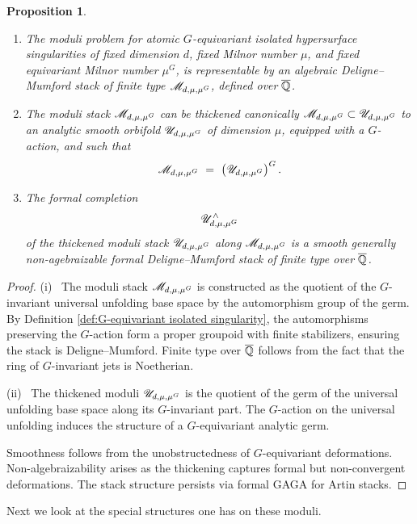 \documentclass[twoside,leqno]{article}
\numberwithin{equation}{section}
\theoremstyle{plain}
\newtheorem{proposition}[equation]{Proposition}
\theoremstyle{definition}
\begin{document}
\begin{proposition}
\begin{enumerate}[wide,label=(\roman*)]
    \item The moduli problem for atomic $G$-equivariant isolated hypersurface singularities of fixed dimension $d$, fixed Milnor number $\mu$, and fixed equivariant Milnor number $\mu^{G}$, is representable by an algebraic Deligne--Mumford stack of finite type 
    $\mathscr{M}_{d,\mu,\mu^{G}}$, defined over $\overline{\mathbb Q}$.
    \item The moduli stack  $\mathscr{M}_{d,\mu,\mu^{G}}$ can be thickened canonically $\mathscr{M}_{d,\mu,\mu^{G}}\subset \mathscr{U}_{d,\mu,\mu^{G}}$ to an analytic smooth orbifold  $\mathscr{U}_{d,\mu,\mu^{G}}$ of dimension $\mu$, equipped with a $G$-action, and such that 
    \[
    \mathscr{M}_{d,\mu,\mu^{G}} \ = \ \left(\mathscr{U}_{d,\mu,\mu^{G}}\right)^{G}.
    \]
    \item The formal completion 
    \[
    \mathscr{U}_{d,\mu,\mu^{G}}^{\wedge}
    \]
    of the thickened moduli stack $\mathscr{U}_{d,\mu,\mu^{G}}$
    along $\mathscr{M}_{d,\mu,\mu^{G}}$ is a smooth generally non-agebraizable formal Deligne--Mumford stack of finite type over $\overline{\mathbb Q}$.
\end{enumerate}
\end{proposition}
\begin{proof}
(i) \ The moduli stack \( \mathscr{M}_{d,\mu,\mu^G} \) is constructed as the quotient of the \( G \)-invariant universal  unfolding base space by the automorphism group of the germ. By Definition \ref{def:G-equivariant isolated singularity}, the automorphisms preserving the \( G \)-action form a proper groupoid with finite stabilizers, ensuring the stack is Deligne--Mumford. Finite type over $\overline{\mathbb Q}$ follows from the fact that the ring of \( G \)-invariant jets is Noetherian.

(ii) \ The thickened moduli $\mathscr{U}_{d,\mu,\mu^G}$ is the quotient of the germ of the universal unfolding base space along its $G$-invariant part. The \( G \)-action on the universal unfolding induces the structure of a \( G \)-equivariant analytic germ. 

Smoothness follows from the unobstructedness of \( G \)-equivariant deformations. Non-algebraiza\-bi\-lity arises as the thickening captures formal but non-convergent deformations. The stack structure persists via formal GAGA for Artin stacks.
\end{proof}

Next we look at the special structures one has on these moduli.
\end{document}
